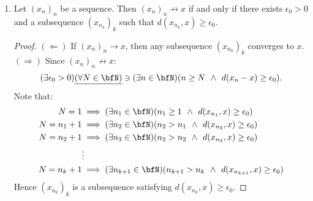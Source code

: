 \begin{enumerate}[label = (\arabic*)]
        \item Let $(x_n)_n$ be a sequence. Then $(x_n)_n \not\rightarrow x$ if and only if there exists $\epsilon_0 > 0$ and a subsequence $(x_{n_k})_k$ such that $d(x_{n_k},x) \geq \epsilon_0$.
            {\color{red} \begin{proof}
                $(\Leftarrow)$ If $(x_n)_n \rightarrow x$, then any subsequence $(x_{n_k})_k$ converges to $x$. $(\Rightarrow)$ Since $(x_n)_n \not\rightarrow x$:
                    \begin{equation*}
                    \begin{split}
                        (\exists \epsilon_0 > 0)\underline{(\forall N \in \bfN)} \ni (\exists n \in \bfN)(n \geq N \hspace{4pt} \land \hspace{4pt} d(x_n - x) \geq \epsilon_0).
                    \end{split}
                    \end{equation*}
                Note that:
                    \begin{equation*}
                    \begin{split}
                        N = 1 & \implies (\exists n_1 \in \bfN)(n_1 \geq 1 \hspace{4pt} \land \hspace{4pt} d(x_{n_1},x) \geq \epsilon_0) \\
                        N = n_1 + 1 & \implies (\exists n_2 \in \bfN)(n_2 > n_1 \hspace{4pt} \land \hspace{4pt} d(x_{n_2},x) \geq \epsilon_0) \\
                        N = n_2 + 1 & \implies (\exists n_3 \in \bfN)(n_3 > n_2 \hspace{4pt} \land \hspace{4pt} d(x_{n_3},x) \geq \epsilon_0) \\
                        &\vdots \\
                        N = n_k + 1 & \implies (\exists n_{k+1} \in \bfN)(n_{k+1} > n_k \hspace{4pt} \land \hspace{4pt} d(x_{n_{k+1}},x) \geq \epsilon_0)
                    \end{split}
                    \end{equation*}
                Hence $(x_{n_k})_k$ is a subsequence satisfying $d(x_{n_k},x) \geq \epsilon_0$.
            \end{proof}}


\end{enumerate}
